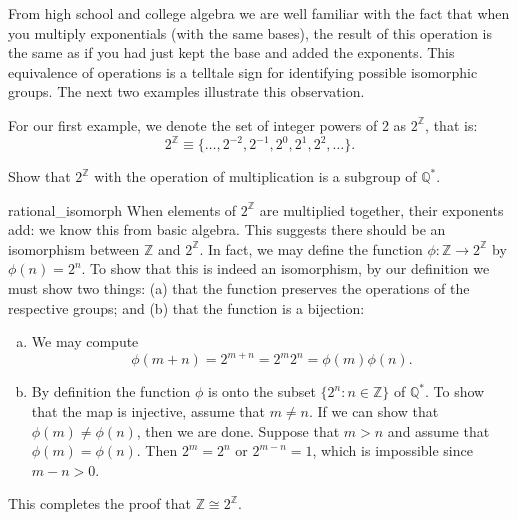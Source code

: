 

From high school and college algebra we are well familiar with the fact that when you multiply exponentials (with the same bases), the result of this operation is the same as if you had just kept the base and added the exponents.  This equivalence of operations is a telltale sign for identifying possible isomorphic groups.  The next two examples illustrate this observation.

For our first example, we   denote the set of integer powers of 2 as $2^{\mathbb Z}$, that is:
\[ 2^{\mathbb Z} \equiv \{\ldots, 2^{-2}, 2^{-1}, 2^0, 2^1, 2^2, \ldots\}. \]
\begin{exercise}{}
Show that $2^{\mathbb Z}$ with the operation of multiplication is a subgroup of ${\mathbb Q}^{\ast}$.
\end{exercise}

\begin{example}{rational_isomorph}
When elements of $2^{\mathbb Z}$ are multiplied together, their exponents add: we know this from basic algebra. This suggests there should be an isomorphism between ${\mathbb Z}$ and   $2^{\mathbb Z}$. In fact, we may define the function
$\phi: {\mathbb Z} \rightarrow 2^{\mathbb Z}$ by $\phi( n ) = 2^n$.
To show that this is indeed an isomorphism, by our definition we must show two things: (a)  that the function preserves the operations of the respective groups; and (b) that the function is a bijection:
\begin{enumerate}[(a)] 
\item
We may compute
\[
\phi( m + n ) = 2^{m + n} = 2^m 2^n = \phi( m ) \phi( n ).
\]
\item
By definition the function $\phi$ is onto the subset $\{2^n :n \in {\mathbb Z} \}$ of  ${\mathbb Q}^\ast$.  To show that the map is injective, assume that $m \neq n$.  If we can show that $\phi(m) \neq \phi(n)$, then we are done.  Suppose that $m>n$ and assume that $\phi(m) = \phi(n)$.  Then $2^m = 2^n$ or $2^{m-n} = 1$, which is impossible since $m-n>0$. 
\end{enumerate}

This completes the proof that $ {\mathbb Z} \cong 2^{\mathbb Z}$.
\end{example}      

